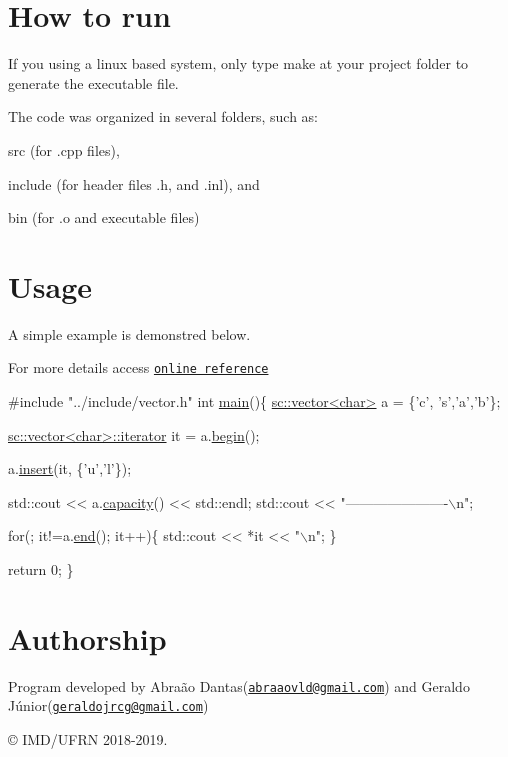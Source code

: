 \section*{How to run}

If you using a linux based system, only type {\ttfamily make} at your project folder to generate the executable file.

The code was organized in several folders, such as\+:
\begin{DoxyItemize}
\item src (for .cpp files),
\item include (for header files .h, and .inl), and
\item bin (for .o and executable files)
\end{DoxyItemize}

\section*{Usage}

A simple example is demonstred below.

For more details access \href{http://en.cppreference.com/w/cpp/container/vector}{\tt online reference}


\begin{DoxyCode}
\textcolor{preprocessor}{#include "../include/vector.h"}
\textcolor{keywordtype}{int} \mbox{\hyperlink{driver__vector_8cpp_ae66f6b31b5ad750f1fe042a706a4e3d4}{main}}()\{
    \mbox{\hyperlink{classsc_1_1vector}{sc::vector<char>}} a = \{\textcolor{charliteral}{'c'}, \textcolor{charliteral}{'s'},\textcolor{charliteral}{'a'},\textcolor{charliteral}{'b'}\};

    \mbox{\hyperlink{classsc_1_1vector_1_1iterator}{sc::vector<char>::iterator}} it = a.\mbox{\hyperlink{classsc_1_1vector_ae198130cd01e8d5a4df07d6567b51eb4}{begin}}();

    a.\mbox{\hyperlink{classsc_1_1vector_ac55608c5cee9a8311cbe7c4fde998a9f}{insert}}(it, \{\textcolor{charliteral}{'u'},\textcolor{charliteral}{'l'}\});

    std::cout << a.\mbox{\hyperlink{classsc_1_1vector_acf5f0cebfb797dac6eb42523d1e7511a}{capacity}}() << std::endl;
    std::cout << \textcolor{stringliteral}{"----------------------\(\backslash\)n"};

    \textcolor{keywordflow}{for}(; it!=a.\mbox{\hyperlink{classsc_1_1vector_a15b7f4313d7a011694d154c030768ad3}{end}}(); it++)\{
            std::cout << *it << \textcolor{stringliteral}{"\(\backslash\)n"};
    \}

    \textcolor{keywordflow}{return} 0;
\}
\end{DoxyCode}


\section*{Authorship}

Program developed by Abraão Dantas(\href{mailto:abraaovld@gmail.com}{\tt abraaovld@gmail.\+com}) and Geraldo Júnior(\href{mailto:geraldojrcg@gmail.com}{\tt geraldojrcg@gmail.\+com})

\copyright{} I\+M\+D/\+U\+F\+RN 2018-\/2019. 